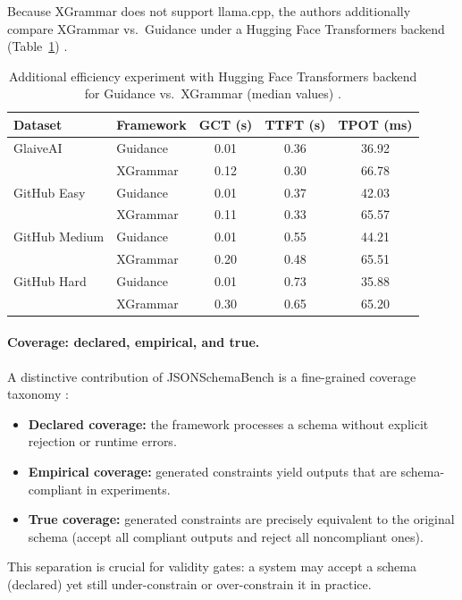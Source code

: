 Because XGrammar does not support llama.cpp, the authors additionally compare XGrammar vs.\ Guidance under a Hugging Face Transformers backend (Table~\ref{tab:jsonschemabench-eff-hf}) \cite{geng2025jsonschemabench}.

\begin{table}[t]
\centering
\small
\setlength{\tabcolsep}{6pt}
\renewcommand{\arraystretch}{1.12}
\begin{tabular}{@{}l l c c c@{}}
\toprule
\textbf{Dataset} & \textbf{Framework} & \textbf{GCT (s)} & \textbf{TTFT (s)} & \textbf{TPOT (ms)} \\
\midrule
GlaiveAI      & Guidance & 0.01 & 0.36 & 36.92 \\
              & XGrammar & 0.12 & 0.30 & 66.78 \\
\midrule
GitHub Easy   & Guidance & 0.01 & 0.37 & 42.03 \\
              & XGrammar & 0.11 & 0.33 & 65.57 \\
\midrule
GitHub Medium & Guidance & 0.01 & 0.55 & 44.21 \\
              & XGrammar & 0.20 & 0.48 & 65.51 \\
\midrule
GitHub Hard   & Guidance & 0.01 & 0.73 & 35.88 \\
              & XGrammar & 0.30 & 0.65 & 65.20 \\
\bottomrule
\end{tabular}
\caption{Additional efficiency experiment with Hugging Face Transformers backend for Guidance vs.\ XGrammar (median values) \cite{geng2025jsonschemabench}.}
\label{tab:jsonschemabench-eff-hf}
\end{table}

\paragraph{Coverage: declared, empirical, and true.}
A distinctive contribution of JSONSchemaBench is a fine-grained coverage taxonomy \cite{geng2025jsonschemabench}:
\begin{itemize}
  \item \textbf{Declared coverage:} the framework processes a schema without explicit rejection or runtime errors.
  \item \textbf{Empirical coverage:} generated constraints yield outputs that are schema-compliant in experiments.
  \item \textbf{True coverage:} generated constraints are precisely equivalent to the original schema (accept all compliant outputs and reject all noncompliant ones).
\end{itemize}
This separation is crucial for validity gates: a system may accept a schema (declared) yet still under-constrain or over-constrain it in practice.

